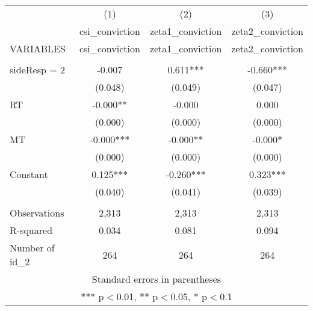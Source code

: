 \documentclass[]{article}
\begin{document}
\begin{tabular}{lccc} \hline
 & (1) & (2) & (3) \\
 & csi\_conviction & zeta1\_conviction & zeta2\_conviction \\
VARIABLES & csi\_conviction & zeta1\_conviction & zeta2\_conviction \\ \hline
 &  &  &  \\
sideResp = 2 & -0.007 & 0.611*** & -0.660*** \\
 & (0.048) & (0.049) & (0.047) \\
RT & -0.000** & -0.000 & 0.000 \\
 & (0.000) & (0.000) & (0.000) \\
MT & -0.000*** & -0.000** & -0.000* \\
 & (0.000) & (0.000) & (0.000) \\
Constant & 0.125*** & -0.260*** & 0.323*** \\
 & (0.040) & (0.041) & (0.039) \\
 &  &  &  \\
Observations & 2,313 & 2,313 & 2,313 \\
R-squared & 0.034 & 0.081 & 0.094 \\
 Number of id\_2 & 264 & 264 & 264 \\ \hline
\multicolumn{4}{c}{ Standard errors in parentheses} \\
\multicolumn{4}{c}{ *** p$<$0.01, ** p$<$0.05, * p$<$0.1} \\
\end{tabular}
\end{document}
